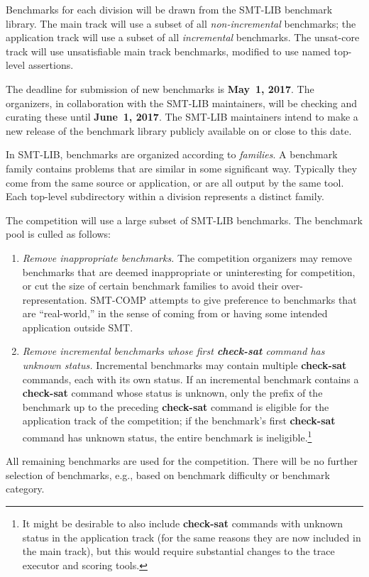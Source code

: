 \documentclass[12pt]{article}
\newcommand{\akey}[1]{\textbf{#1}}
\begin{document}
%
Benchmarks for each division will be drawn from the SMT-LIB benchmark
library.  The main track will use a subset of all
\emph{non-incremental} benchmarks; the application track will use a
subset of all \emph{incremental} benchmarks.  The unsat-core track
will use unsatisfiable main track benchmarks, modified to use named
top-level assertions.

%
The deadline for submission of new benchmarks is {\bf May~1, 2017}.
The organizers, in collaboration with the SMT-LIB maintainers, will be
checking and curating these until {\bf June~1, 2017}.  The SMT-LIB
maintainers intend to make a new release of the benchmark library
publicly available on or close to this date.

%
In SMT-LIB, benchmarks are organized according to \emph{families}.  A
benchmark family contains problems that are similar in some
significant way.  Typically they come from the same source or
application, or are all output by the same tool.  Each top-level
subdirectory within a division represents a distinct family.

%
The competition will use a large subset of SMT-LIB benchmarks.  The
benchmark pool is culled as follows:
\begin{enumerate}
\item \emph{Remove inappropriate benchmarks.} The competition
  organizers may remove benchmarks that are deemed inappropriate or
  uninteresting for competition, or cut the size of certain benchmark
  families to avoid their over-representation.  SMT-COMP attempts to
  give preference to benchmarks that are ``real-world,'' in the sense
  of coming from or having some intended application outside SMT.
\item \emph{Remove incremental benchmarks whose first \akey{check-sat}
  command has unknown status.}  Incremental benchmarks may contain
  multiple \akey{check-sat} commands, each with its own status.  If an
  incremental benchmark contains a \akey{check-sat} command whose
  status is unknown, only the prefix of the benchmark up to the
  preceding \akey{check-sat} command is eligible for the application
  track of the competition; if the benchmark's first \akey{check-sat}
  command has unknown status, the entire benchmark is
  ineligible.\footnote{It might be desirable to also include
    \akey{check-sat} commands with unknown status in the application
    track (for the same reasons they are now included in the main
    track), but this would require substantial changes to the trace
    executor and scoring tools.}
\end{enumerate}
%
All remaining benchmarks are used for the competition.  There will be
no further selection of benchmarks, e.g., based on benchmark
difficulty or benchmark category.
\end{document}
